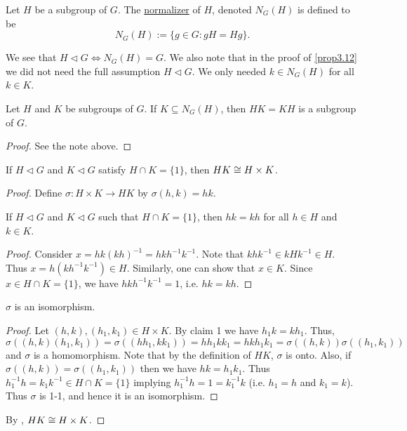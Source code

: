 \documentclass[11pt]{article}
\begin{document}
\begin{definition}[Normalizers]
    Let $H$ be a subgroup of $G$. The \ul{normalizer} of $H$, denoted $N_G(H)$ is defined to be
    \[N_G(H):=\{g\in G:gH=Hg\}.\]
\end{definition}

\begin{note}
    We see that $H\lhd G\iff N_G(H)=G$. We also note that in the proof of \ref{prop3.12} we did not need the full assumption $H\lhd G$. We only needed $k\in N_G(H)$ for all $k\in K$.
\end{note}

\begin{corollary}
    Let $H$ and $K$ be subgroups of $G$. If $K\subseteq N_G(H)$, then $HK=KH$ is a subgroup of $G$.
\end{corollary}

\begin{proof}
    See the note above.
\end{proof}

\begin{proposition}
    If $H\lhd G$ and $K\lhd G$ satisfy $H\cap K=\{1\}$, then $HK\cong H\times K$.
\end{proposition}

\begin{proof}
    Define $\sigma:H\times K\to HK$ by $\sigma(h,k)=hk$.
    \begin{claim}
        If $H\lhd G$ and $K\lhd G$ such that $H\cap K=\{1\}$, then $hk=kh$ for all $h\in H$ and $k\in K$.
    \end{claim}
    \begin{proof}
        Consider $x=hk(kh)^{-1}=hkh^{-1}k^{-1}$. Note that $khk^{-1}\in kHk^{-1}\in H$. Thus $x=h(kh^{-1}k^{-1})\in H$. Similarly, one can show that $x\in K$. Since $x\in H\cap K=\{1\}$, we have $hkh^{-1}k^{-1}=1$, i.e. $hk=kh$.
    \end{proof}
    \begin{claim}
        $\sigma$ is an isomorphism.
    \end{claim}
    \begin{proof}
        Let $(h,k),(h_1,k_1)\in H\times K$. By claim 1 we have $h_1k=kh_1$. Thus,
        \[\sigma((h,k)(h_1,k_1))=\sigma((hh_1,kk_1))=hh_1kk_1=hkh_1k_1=\sigma((h,k))\sigma((h_1,k_1))\]
        and $\sigma$ is a homomorphism. Note that by the definition of $HK$, $\sigma$ is onto. Also, if $\sigma((h,k))=\sigma((h_1,k_1))$ then we have $hk=h_1k_1$. Thus $h_1^{-1}h=k_1k^{-1}\in H\cap K=\{1\}$ implying $h_1^{-1}h=1=k_1^{-1}k$ (i.e. $h_1=h$ and $k_1=k$). Thus $\sigma$ is 1-1, and hence it is an isomorphism.
    \end{proof}
    By , $HK\cong H\times K$.
\end{proof}
\end{document}
